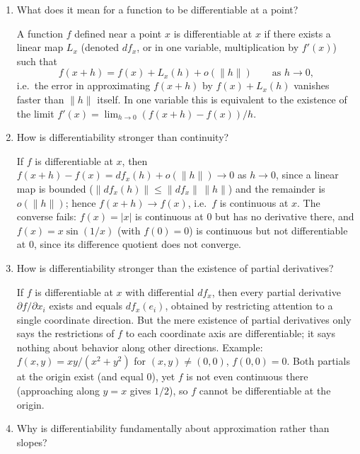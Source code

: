 \documentclass{self-check}
\begin{document}
\begin{enumerate}[leftmargin=*, itemsep=8pt]
  \item What does it mean for a function to be differentiable at a point?
    \begin{answer}
      A function \(f\) defined near a point \(x\) is differentiable at \(x\) if there exists a linear map \(L_{x}\) (denoted \(df_{x}\), or in one variable, multiplication by \(f'(x)\)) such that
      \[ f(x+h) = f(x) + L_{x}(h) + o(\|h\|) \qquad \text{as }h\to0, \]
      i.e.\ the error in approximating \(f(x+h)\) by \(f(x)+L_{x}(h)\) vanishes faster than \(\|h\|\) itself. In one variable this is equivalent to the existence of the limit \(f'(x)=\lim_{h\to0}(f(x+h)-f(x))/h\).
    \end{answer}
  \item How is differentiability stronger than continuity?
    \begin{answer}
      If \(f\) is differentiable at \(x\), then \(f(x+h)-f(x)=df_{x}(h)+o(\|h\|)\to0\) as \(h\to0\), since a linear map is bounded (\(\|df_{x}(h)\|\le\|df_{x}\|\,\|h\|\)) and the remainder is \(o(\|h\|)\); hence \(f(x+h)\to f(x)\), i.e.\ \(f\) is continuous at \(x\). The converse fails: \(f(x)=|x|\) is continuous at \(0\) but has no derivative there, and \(f(x)=x\sin(1/x)\) (with \(f(0)=0\)) is continuous but not differentiable at \(0\), since its difference quotient does not converge.
    \end{answer}
  \item How is differentiability stronger than the existence of partial derivatives?
    \begin{answer}
      If \(f\) is differentiable at \(x\) with differential \(df_{x}\), then every partial derivative \(\partial f/\partial x_{i}\) exists and equals \(df_{x}(e_{i})\), obtained by restricting attention to a single coordinate direction. But the mere existence of partial derivatives only says the restrictions of \(f\) to each coordinate axis are differentiable; it says nothing about behavior along other directions. Example: \(f(x,y)=xy/(x^{2}+y^{2})\) for \((x,y)\ne(0,0)\), \(f(0,0)=0\). Both partials at the origin exist (and equal \(0\)), yet \(f\) is not even continuous there (approaching along \(y=x\) gives \(1/2\)), so \(f\) cannot be differentiable at the origin.
    \end{answer}
  \item Why is differentiability fundamentally about approximation rather than slopes?
    \begin{answer}

\end{answer}
\end{enumerate}
\end{document}
